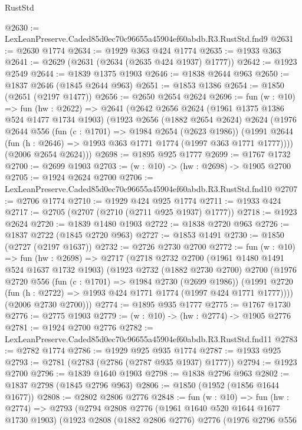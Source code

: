 \begin{lexlean}{RustStd}
\begin{coremodule}
@2630 := LexLeanPreserve.Caded85d0ec70c96655a45904ef60abdb.R3.RustStd.fnd9
@2631 := @2630 @1774
@2634 := @1929 @363 @424 @1774
@2635 := @1933 @363
@2641 := @2629 (@2631 (@2634 (@2635 @424 @1937) @1777))
@2642 := @1923 @2549
@2644 := @1839 @1375 @1903
@2646 := @1838 @2644 @963
@2650 := @1837 @2646 (@1845 @2644 @963)
@2651 := @1853 @1386
@2654 := @1850 (@2651 (@2197 @1477))
@2656 := @2650 @2654 @2624
@2696 := fun (w : @10) =>
  fun (hw : @2622) =>
  @2641
    (@2642
      @2656
      @2624
      (@1961 @1375 @1386 @524 @1477 @1734 @1903)
      (@1923
        @2656
        (@1882 @2654 @2624)
        @2624
        (@1976
          @2644
          @556
          (fun (c : @1701) => @1984 @2654 (@2623 @1986))
          (@1991 @2644 (fun (h : @2646) => @1993 @363 @1771 @1774 (@1997 @363 @1771 @1777))))
        (@2006 @2654 @2624)))
@2698 := @1895 @925 @1777
@2699 := @1767 @1732
@2700 := @2699 @1903
@2703 := (w : @10) -> (hw : @2698) -> @1905 @2700
@2705 := @1924 @2624 @2700
@2706 := LexLeanPreserve.Caded85d0ec70c96655a45904ef60abdb.R3.RustStd.fnd10
@2707 := @2706 @1774
@2710 := @1929 @424 @925 @1774
@2711 := @1933 @424
@2717 := @2705 (@2707 (@2710 (@2711 @925 @1937) @1777))
@2718 := @1923 @2624
@2720 := @1839 @1480 @1903
@2722 := @1838 @2720 @963
@2726 := @1837 @2722 (@1845 @2720 @963)
@2727 := @1853 @1491
@2730 := @1850 (@2727 (@2197 @1637))
@2732 := @2726 @2730 @2700
@2772 := fun (w : @10) =>
  fun (hw : @2698) =>
  @2717
    (@2718
      @2732
      @2700
      (@1961 @1480 @1491 @524 @1637 @1732 @1903)
      (@1923
        @2732
        (@1882 @2730 @2700)
        @2700
        (@1976
          @2720
          @556
          (fun (c : @1701) => @1984 @2730 (@2699 @1986))
          (@1991 @2720 (fun (h : @2722) => @1993 @424 @1771 @1774 (@1997 @424 @1771 @1777))))
        (@2006 @2730 @2700)))
@2774 := @1895 @935 @1777
@2775 := @1767 @1730
@2776 := @2775 @1903
@2779 := (w : @10) -> (hw : @2774) -> @1905 @2776
@2781 := @1924 @2700 @2776
@2782 := LexLeanPreserve.Caded85d0ec70c96655a45904ef60abdb.R3.RustStd.fnd11
@2783 := @2782 @1774
@2786 := @1929 @925 @935 @1774
@2787 := @1933 @925
@2793 := @2781 (@2783 (@2786 (@2787 @935 @1937) @1777))
@2794 := @1923 @2700
@2796 := @1839 @1640 @1903
@2798 := @1838 @2796 @963
@2802 := @1837 @2798 (@1845 @2796 @963)
@2806 := @1850 (@1952 (@1856 @1644 @1677))
@2808 := @2802 @2806 @2776
@2848 := fun (w : @10) =>
  fun (hw : @2774) =>
  @2793
    (@2794
      @2808
      @2776
      (@1961 @1640 @520 @1644 @1677 @1730 @1903)
      (@1923
        @2808
        (@1882 @2806 @2776)
        @2776
        (@1976
          @2796
          @556

\end{coremodule}
\end{lexlean}
